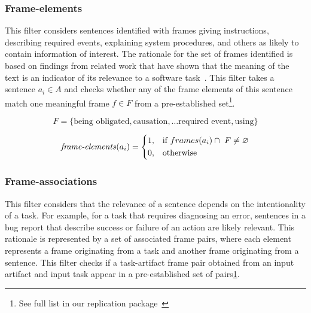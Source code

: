 \subsubsection{Frame-elements}

This filter considers sentences identified with
frames giving instructions, describing required events, explaining system procedures, and others as
 likely to contain information of interest. The rationale for
 the set of frames identified is based on findings from related work that have shown that 
the meaning of the text is an indicator of its relevance to a software task~\cite{marques2020}.
This filter takes a sentence $a_i \in A$ and checks whether any of the frame elements
of this sentence match one meaningful frame $f \in F$ from a pre-established set\footnote{\label{full-list}See full list in our replication package~\cite{supplementary_material}}. 

\begin{small}
\begin{equation}
F = \{ \text{being obligated}, \text{causation}, \dots \text{required event}, \text{using} \} 
\end{equation}

\begin{equation}
\text{\textit{frame-elements}}(a_i) = \left \{
\begin{aligned}
    &1, && \text{if}\ frames(a_i) \cap ~F \ne \emptyset \\
    &0, && \text{otherwise}
\end{aligned} \right.
\end{equation} 
\end{small}


\subsubsection{Frame-associations}

This filter considers that the relevance of a sentence depends on the intentionality of a task. 
For example, for a task that requires diagnosing an error, sentences in a bug report that describe success or failure 
of an action are likely relevant. 
This rationale is represented by a set of associated frame pairs, where each element represents a frame originating from a task and another frame originating from a sentence.
This filter checks if a task-artifact frame pair obtained from an input artifact and input task appear in a pre-established set of pairs\cref{full-list}.


